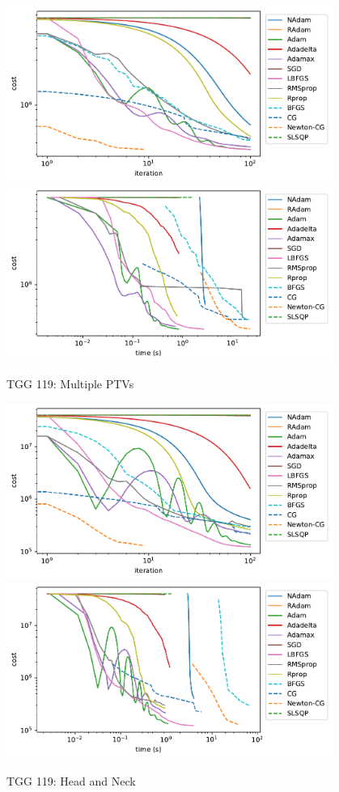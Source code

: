 \documentclass[a4paper]{article}
\begin{document}
	\begin{figure}[H]
		\centering
		\includegraphics[width=0.95\textwidth]{figures/TGG119Multi-iter.pdf}		\includegraphics[width=0.95\textwidth]{figures/TGG119Multi-time.pdf}
		\caption{TGG 119: Multiple PTVs}
		\label{fig:tgg119multi}
	\end{figure}
	
	\begin{figure}[H]
		\centering
		\includegraphics[width=0.95\textwidth]{figures/TGG119HN-iter.pdf}		\includegraphics[width=0.95\textwidth]{figures/TGG119HN-time.pdf}
		\caption{TGG 119: Head and Neck}
		\label{fig:tgg119hn}
	\end{figure}
	
\end{document}
